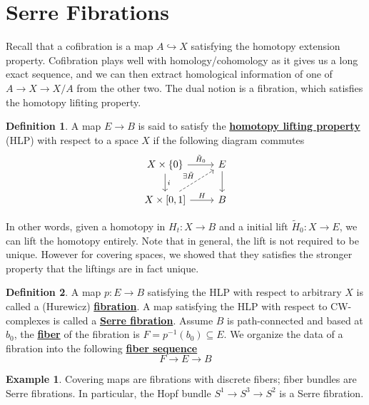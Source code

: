\documentclass{article}
\theoremstyle{definition}
\theoremstyle{definition}
\theoremstyle{definition}
\theoremstyle{definition}
\theoremstyle{definition}
\newtheorem{definition}{Definition}[section]
\theoremstyle{definition}
\theoremstyle{definition}
\newtheorem{example}{Example}[section]
\begin{document}
\section{Serre Fibrations}
Recall that a cofibration is a map $A\hookrightarrow X$ satisfying the homotopy extension property. Cofibration plays well with homology/cohomology as it gives us a long exact sequence, and we can then extract homological information of one of $A\to X\to X/A$ from the other two. The dual notion is a fibration, which satisfies the homotopy lifiting property.

\begin{tcolorbox}[colback=purple!5!white,colframe=purple!75!black]
\begin{definition}
A map $E\to B$ is said to satisfy the \underline{\textbf{homotopy lifting property}} (HLP) with respect to a space $X$ if the following diagram commutes
\[
\begin{tikzcd}
X\times \{0\}\arrow[r,"\tilde{H}_0"]\arrow[d,"i"]&E\arrow[d]\\
X\times [0,1]\arrow[r,"H"]\arrow[ur,dashed,"\exists \tilde{H}"]&B
\end{tikzcd}    
\]
\end{definition}
\end{tcolorbox}
In other words, given a homotopy in $H_t: X\to B$ and a initial lift $\tilde{H}_0: X\to E$, we can lift the homotopy entirely. Note that in general, the lift is not required to be unique. However for covering spaces, we showed that they satisfies the stronger property that the liftings are in fact unique. 

\begin{tcolorbox}[colback=purple!5!white,colframe=purple!75!black]
\begin{definition}
A map $p:E\to B$ satisfying the HLP with respect to arbitrary $X$ is called a (Hurewicz)  \underline{\textbf{fibration}}. A map satisfying the HLP with respect to CW-complexes is called a \underline{\textbf{Serre fibration}}. Assume $B$ is path-connected and based at $b_0$, the \underline{\textbf{fiber}} of the fibration is $F=p^{-1}(b_0)\subseteq E$. We organize the data of a fibration into the following \underline{\textbf{fiber sequence}}
\[F\to E\to B\]
\end{definition}
\end{tcolorbox}

\begin{tcolorbox}[colback=yellow!5!white,colframe=yellow!30!white]
\begin{example}
	Covering maps are fibrations with discrete fibers; fiber bundles are Serre fibrations. In particular, the Hopf bundle $S^1\to S^3\to S^2$ is a Serre fibration. 
\end{example}
\end{tcolorbox}
\end{document}
